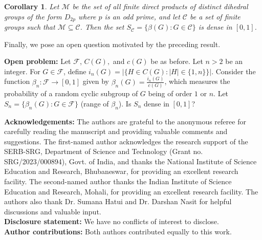 \documentclass[a4paper,11pt]{amsart}
\numberwithin{equation}{section}
\numberwithin{equation}{subsection}
\newtheorem{corollary}[theorem]{Corollary}
\begin{document}
    \begin{corollary}
    Let $\mathcal{M}$ be the set of all finite direct products of distinct dihedral groups of the form $D_{2p}$ where $p$ is an odd prime, and let $\mathcal{C}$ be a set of finite groups such that $\mathcal{M} \subseteq \mathcal{C}$. Then the set $S_\mathcal{C} = \{\beta(G) : G \in \mathcal{C}\}$ is dense in $[0,1]$.
\end{corollary}


Finally, we pose an open question motivated by the preceding result.

\vspace{5mm}

\noindent\textbf{Open problem:} Let $\mathcal{F}$, $C(G),$ and $c(G)$ be as before. Let $n>2$ be an integer. For $G\in \mathcal{F}$, define $i_{n}(G)=\left|\{H\in C(G): |H|\in \{ 1,n\}\}\right|$. Consider the function $\beta_{n}: \mathcal{F}\to [0,1]$ given by $\beta_{n}(G)=\frac{i_n(G)}{c(G)}$,  which measures
the probability of a random cyclic subgroup of $G$ being of order $1$ or $n$. Let $S_{n}=\{\beta_{n}(G): G\in \mathcal{F}\}$ (range of $\beta_{n}$). Is $S_{n}$ dense in $[0,1]$?


\vspace{5mm}    



\noindent\textbf{Acknowledgements:} 
The authors are grateful to the anonymous referee for carefully reading the manuscript and providing valuable comments and suggestions. The first-named author acknowledges the research support of the SERB-SRG, Department of Science and Technology (Grant no. SRG/2023/000894), Govt. of India, and thanks the National Institute of Science Education and Research, Bhubaneswar, for providing an excellent research facility. The second-named author thanks the Indian Institute of Science Education and Research, Mohali, for providing an excellent research facility. The authors also thank Dr. Sumana Hatui and Dr. Darshan Nasit for helpful discussions and valuable input.\\

\noindent\textbf{Disclosure statement:}  We have no conflicts of interest to disclose. \\


\noindent\textbf{Author contributions:} Both authors contributed equally to this work.
\end{document}
